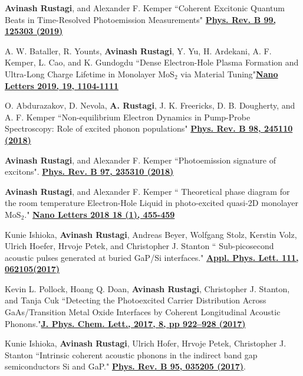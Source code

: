 \documentclass[11pt]{article}
\begin{document}
\begin{etaremune}
    \item {\bf Avinash Rustagi}, and Alexander F. Kemper ``Coherent Excitonic Quantum Beats in Time-Resolved Photoemission Measurements" \href{http://doi.org/10.1103/PhysRevB.99.125303}{\bf Phys. Rev. B 99, 125303 (2019)}

    \item A. W. Bataller, R. Younts, {\bf Avinash Rustagi}, Y. Yu,  H. Ardekani, A. F. Kemper, L. Cao, and K. Gundogdu ``Dense Electron-Hole Plasma Formation and Ultra-Long Charge Lifetime in Monolayer MoS$_2$ via Material Tuning"\href{http://doi.org/10.1021/acs.nanolett.8b04408}{\bf  Nano Letters 2019, 19, 1104-1111}

        \item O. Abdurazakov, D. Nevola, {\bf A. Rustagi}, J. K. Freericks, D. B. Dougherty, and A. F. Kemper ``Non-equilibrium Electron Dynamics in Pump-Probe Spectroscopy: Role of excited phonon populations" \href{http://doi.org/10.1103/PhysRevB.98.245110}{\bf  Phys. Rev. B 98, 245110 (2018)}

    \item {\bf Avinash Rustagi}, and Alexander F. Kemper ``Photoemission signature of excitons". \href{https://link.aps.org/doi/10.1103/PhysRevB.97.235310}{\bf Phys. Rev. B 97, 235310 (2018)}


	\item {\bf Avinash Rustagi}, and Alexander F. Kemper `` Theoretical phase diagram for the room temperature Electron-Hole Liquid in photo-excited quasi-2D monolayer MoS$_2$." \href{http://pubs.acs.org/doi/abs/10.1021/acs.nanolett.7b04377} {\bf Nano Letters 2018 18 (1), 455-459}

	\item Kunie Ishioka, {\bf Avinash Rustagi}, Andreas Beyer, Wolfgang Stolz, Kerstin Volz, Ulrich Hoefer, Hrvoje Petek, and Christopher J. Stanton `` Sub-picosecond acoustic pulses generated at buried GaP/Si interfaces." \href{http://aip.scitation.org/doi/full/10.1063/1.4997913}{\bf  Appl. Phys. Lett. 111, 062105(2017)}
 
	\item Kevin L. Pollock, Hoang Q. Doan, {\bf Avinash Rustagi}, Christopher J. Stanton, and Tanja Cuk ``Detecting the Photoexcited Carrier Distribution Across GaAs/Transition Metal Oxide Interfaces by Coherent Longitudinal Acoustic Phonons."\href{http://pubs.acs.org/doi/abs/10.1021/acs.jpclett.6b02835} {\bf J. Phys. Chem. Lett., 2017, 8, pp 922–928 (2017)}

       \item Kunie Ishioka, {\bf Avinash Rustagi}, Ulrich Hofer, Hrvoje Petek, Christopher J. Stanton  ``Intrinsic coherent acoustic phonons in the indirect band gap semiconductors Si and GaP." \href{http://journals.aps.org/prb/abstract/10.1103/PhysRevB.95.035205} {\bf Phys. Rev. B 95, 035205 (2017)}.


\end{etaremune}
\end{document}

